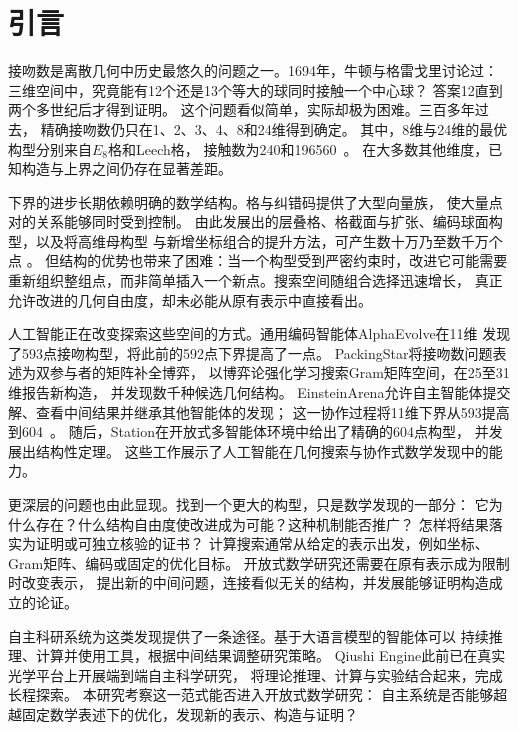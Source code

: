 \section{引言}

接吻数是离散几何中历史最悠久的问题之一。1694年，牛顿与格雷戈里讨论过：
三维空间中，究竟能有12个还是13个等大的球同时接触一个中心球？
答案12直到两个多世纪后才得到证明\cite{musin}。
这个问题看似简单，实际却极为困难。三百多年过去，
精确接吻数仍只在1、2、3、4、8和24维得到确定。
其中，8维与24维的最优构型分别来自$E_8$格和Leech格，
接触数为240和196560~\cite{conway1999sphere,musin}。
在大多数其他维度，已知构造与上界之间仍存在显著差距。

下界的进步长期依赖明确的数学结构。格与纠错码提供了大型向量族，
使大量点对的关系能够同时受到控制\cite{conway1999sphere,macwilliams}。
由此发展出的层叠格、格截面与扩张、编码球面构型，以及将高维母构型
与新增坐标组合的提升方法，可产生数十万乃至数千万个点
\cite{laminated,antipode,ers,cjkt,kallal}。
但结构的优势也带来了困难：当一个构型受到严密约束时，改进它可能需要
重新组织整组点，而非简单插入一个新点。搜索空间随组合选择迅速增长，
真正允许改进的几何自由度，却未必能从原有表示中直接看出。

人工智能正在改变探索这些空间的方式。通用编码智能体AlphaEvolve在11维
发现了593点接吻构型，将此前的592点下界提高了一点\cite{alphaevolve}。
PackingStar将接吻数问题表述为双参与者的矩阵补全博弈，
以博弈论强化学习搜索Gram矩阵空间，在25至31维报告新构造，
并发现数千种候选几何结构\cite{packingstar-discovery}。
EinsteinArena允许自主智能体提交解、查看中间结果并继承其他智能体的发现；
这一协作过程将11维下界从593提高到604~\cite{einsteinarena}。
随后，Station在开放式多智能体环境中给出了精确的604点构型，
并发展出结构性定理\cite{station}。
这些工作展示了人工智能在几何搜索与协作式数学发现中的能力。

更深层的问题也由此显现。找到一个更大的构型，只是数学发现的一部分：
它为什么存在？什么结构自由度使改进成为可能？这种机制能否推广？
怎样将结果落实为证明或可独立核验的证书？
计算搜索通常从给定的表示出发，例如坐标、Gram矩阵、编码或固定的优化目标。
开放式数学研究还需要在原有表示成为限制时改变表示，
提出新的中间问题，连接看似无关的结构，并发展能够证明构造成立的论证。

自主科研系统为这类发现提供了一条途径。基于大语言模型的智能体可以
持续推理、计算并使用工具，根据中间结果调整研究策略。
Qiushi Engine此前已在真实光学平台上开展端到端自主科学研究，
将理论推理、计算与实验结合起来，完成长程探索\cite{qiushi-optics}。
本研究考察这一范式能否进入开放式数学研究：
自主系统是否能够超越固定数学表述下的优化，发现新的表示、构造与证明？

